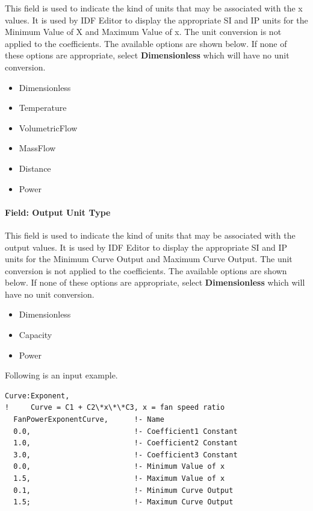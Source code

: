 This field is used to indicate the kind of units that may be associated with the x values. It is used by IDF Editor to display the appropriate SI and IP units for the Minimum Value of X and Maximum Value of x. The unit conversion is not applied to the coefficients. The available options are shown below. If none of these options are appropriate, select \textbf{Dimensionless} which will have no unit conversion.

\begin{itemize}
\item
  Dimensionless
\item
  Temperature
\item
  VolumetricFlow
\item
  MassFlow
\item
  Distance
\item
  Power
\end{itemize}

\paragraph{Field: Output Unit Type}\label{field-output-unit-type-4}

This field is used to indicate the kind of units that may be associated with the output values. It is used by IDF Editor to display the appropriate SI and IP units for the Minimum Curve Output and Maximum Curve Output. The unit conversion is not applied to the coefficients. The available options are shown below. If none of these options are appropriate, select \textbf{Dimensionless} which will have no unit conversion.

\begin{itemize}
\item
  Dimensionless
\item
  Capacity
\item
  Power
\end{itemize}

Following is an input example.

\begin{lstlisting}
Curve:Exponent,
!     Curve = C1 + C2\*x\*\*C3, x = fan speed ratio
  FanPowerExponentCurve,      !- Name
  0.0,                        !- Coefficient1 Constant
  1.0,                        !- Coefficient2 Constant
  3.0,                        !- Coefficient3 Constant
  0.0,                        !- Minimum Value of x
  1.5,                        !- Maximum Value of x
  0.1,                        !- Minimum Curve Output
  1.5;                        !- Maximum Curve Output
\end{lstlisting}

